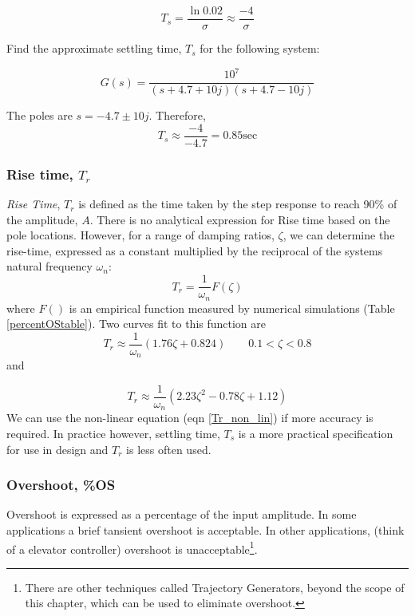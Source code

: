 \[
T_s = \frac{\ln{0.02}}{\sigma} \approx \frac{-4}{\sigma}
\]

\begin{ExampleSmall}
Find the approximate settling time, $T_s$ for the following system:

\[
G(s) = \frac {10^7}  {(s+4.7+10j)(s+4.7-10j)}
\]

\vspace{0.25in}
The poles are $s=-4.7\pm10j$.  Therefore,
\[
T_s \approx \frac{-4}{-4.7}  = 0.85 \mathrm{sec}
\]
\end{ExampleSmall}



\subsubsection{Rise time, $T_r$}
{\it Rise Time}, $T_r$ is defined as the time taken by the step response to reach 90\% of the amplitude, $A$.
There is no analytical expression for Rise time based on the pole locations.   However, for a range of damping ratios, $\zeta$,
we can determine the rise-time, expressed as a constant multiplied by the reciprocal of the systems natural frequency $\omega_n$:
\begin{equation}
T_r = \frac{1}{\omega_n}F(\zeta)
\end{equation}
where $F()$ is an empirical function measured by numerical simulations (Table \ref{percentOStable}).   Two curves fit to this function are
\begin{equation}
T_r \approx \frac{1}{\omega_n}(1.76\zeta + 0.824) \qquad   0.1< \zeta < 0.8
\end{equation}
and

\begin{equation}\label{Tr_non_lin}
T_r \approx \frac{1}{\omega_n}(2.23\zeta^2 - 0.78\zeta + 1.12)
\end{equation}
We can use the non-linear equation (eqn \ref{Tr_non_lin}) if more accuracy is required.
In practice however, settling time, $T_s$ is a more practical specification for use in design and $T_r$ is less often used.


\subsubsection{Overshoot, \%OS}

Overshoot is expressed as a percentage of the input amplitude.   In some applications a brief tansient overshoot is acceptable.  In other applications, (think of a elevator controller) overshoot is unacceptable\footnote{There are other techniques called Trajectory Generators, beyond the scope of this chapter, which can be used to eliminate overshoot.}.

